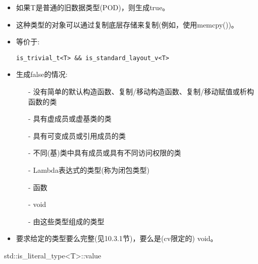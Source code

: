 \begin{itemize}
\item 
如果T是普通的旧数据类型(POD)，则生成true。

\item 
这种类型的对象可以通过复制底层存储来复制(例如，使用memcpy())。

\item
等价于: 
\begin{lstlisting}[style=styleCXX]
is_trivial_t<T> && is_standard_layout_v<T>
\end{lstlisting}

\item
生成false的情况:

\begin{itemize}
\item [-]
没有简单的默认构造函数、复制/移动构造函数、复制/移动赋值或析构函数的类

\item [-]
具有虚成员或虚基类的类

\item [-]
具有可变成员或引用成员的类

\item [-]
不同(基)类中具有成员或具有不同访问权限的类

\item [-]
Lambda表达式的类型(称为闭包类型)

\item [-]
函数

\item [-]
void

\item [-]
由这些类型组成的类型
\end{itemize}

\item
要求给定的类型要么完整(见10.3.1节)，要么是(cv限定的) void。
\end{itemize}

std::is\_literal\_type<T>::value

